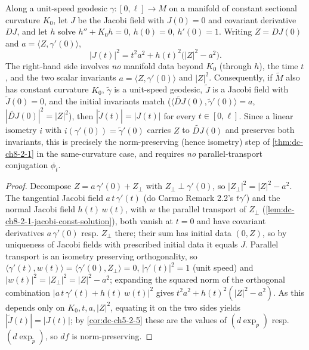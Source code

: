 \begin{lemma}
  \label{lem:dc-ch8-2-1-jacobi-norm-transfer}
  \leanok
  Along a unit-speed geodesic $\gamma:[0,\ell]\to M$ on a manifold of constant sectional
  curvature $K_0$, let $J$ be the Jacobi field with $J(0)=0$ and covariant derivative
  $DJ$, and let $h$ solve $h''+K_0 h=0$, $h(0)=0$, $h'(0)=1$. Writing $Z=DJ(0)$ and
  $a=\langle Z,\gamma'(0)\rangle$,
  $$
  |J(t)|^2 = t^2 a^2 + h(t)^2\big(|Z|^2-a^2\big).
  $$
  The right-hand side involves \emph{no} manifold data beyond $K_0$ (through $h$), the
  time $t$, and the two scalar invariants $a=\langle Z,\gamma'(0)\rangle$ and $|Z|^2$.
  Consequently, if $\tilde M$ also has constant curvature $K_0$, $\tilde\gamma$ is a
  unit-speed geodesic, $\tilde J$ is a Jacobi field with $\tilde J(0)=0$, and the initial
  invariants match ($\langle\tilde{DJ}(0),\tilde\gamma'(0)\rangle=a$,
  $|\tilde{DJ}(0)|^2=|Z|^2$), then $|\tilde J(t)|=|J(t)|$ for every $t\in[0,\ell]$. Since a
  linear isometry $i$ with $i(\gamma'(0))=\tilde\gamma'(0)$ carries $Z$ to $\tilde{DJ}(0)$
  and preserves both invariants, this is precisely the norm-preserving (hence isometry)
  step of \cref{thm:dc-ch8-2-1} in the same-curvature case, and requires \emph{no}
  parallel-transport conjugation $\phi_t$.
\end{lemma}
\begin{proof}
  \leanok
  Decompose $Z=a\,\gamma'(0)+Z_\perp$ with $Z_\perp\perp\gamma'(0)$, so
  $|Z_\perp|^2=|Z|^2-a^2$. The tangential Jacobi field $a\,t\,\gamma'(t)$ (do Carmo
  Remark 2.2's $t\gamma'$) and the normal Jacobi field $h(t)\,w(t)$, with $w$ the parallel
  transport of $Z_\perp$ (\cref{lem:dc-ch8-2-1-jacobi-const-solution}), both vanish at
  $t=0$ and have covariant derivatives $a\,\gamma'(0)$ resp. $Z_\perp$ there; their sum has
  initial data $(0,Z)$, so by uniqueness of Jacobi fields with prescribed initial data it
  equals $J$. Parallel transport is an isometry preserving orthogonality, so
  $\langle\gamma'(t),w(t)\rangle=\langle\gamma'(0),Z_\perp\rangle=0$, $|\gamma'(t)|^2=1$
  (unit speed) and $|w(t)|^2=|Z_\perp|^2=|Z|^2-a^2$; expanding the squared norm of the
  orthogonal combination $|a\,t\,\gamma'(t)+h(t)\,w(t)|^2$ gives
  $t^2a^2+h(t)^2(|Z|^2-a^2)$. As this depends only on $K_0,t,a,|Z|^2$, equating it on the
  two sides yields $|\tilde J(t)|=|J(t)|$; by \cref{cor:dc-ch5-2-5} these are the values of
  $(d\exp_p)$ resp. $(d\exp_{\tilde p})$, so $df$ is norm-preserving.
\end{proof}

